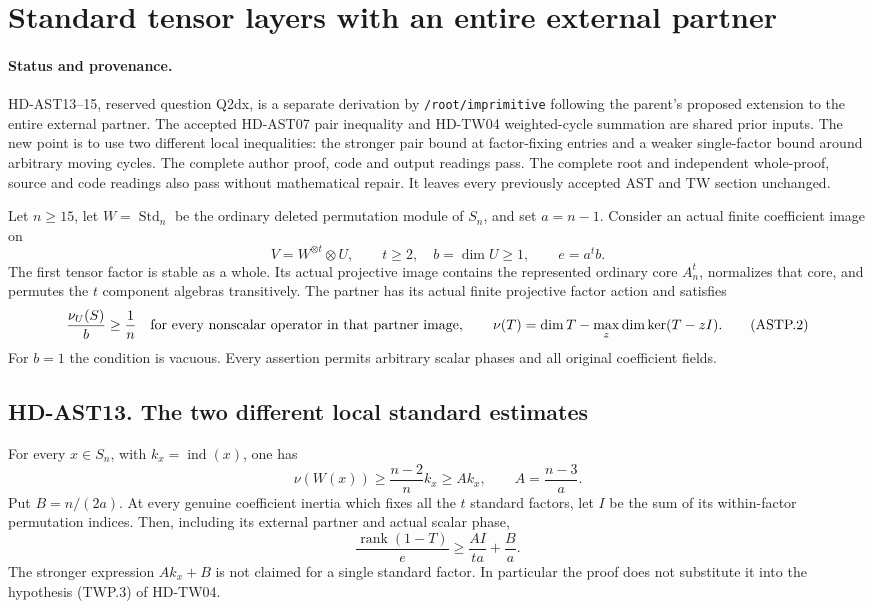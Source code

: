 \section{Standard tensor layers with an entire external partner}
\label{sec:standard-entire-partner}

\paragraph{Status and provenance.}
HD-AST13--15, reserved question Q2dx, is a separate derivation by
\texttt{/root/imprimitive} following the parent's proposed extension
to the entire external partner.  The accepted HD-AST07 pair inequality
and HD-TW04 weighted-cycle summation are shared prior inputs.  The new
point is to use two different local inequalities: the stronger pair
bound at factor-fixing entries and a weaker single-factor bound around
arbitrary moving cycles.  The complete author proof, code and output
readings pass. The complete root and independent whole-proof, source and code readings also pass without mathematical repair.  It leaves every
previously accepted AST and TW section unchanged.

Let $n\ge15$, let $W=\operatorname{Std}_n$ be the ordinary deleted
permutation module of $S_n$, and set $a=n-1$.  Consider an actual
finite coefficient image on
\[
 V=W^{\otimes t}\otimes U,\qquad t\ge2,\quad b=\dim U\ge1,
 \qquad e=a^t b.
 \tag{ASTP.1}
\]
The first tensor factor is stable as a whole.  Its actual projective
image contains the represented ordinary core $A_n^t$, normalizes that
core, and permutes the $t$ component algebras transitively.  The partner
has its actual finite projective factor action and satisfies
\[
 \frac{\nu_U(S)}b\ge\frac1n
 \quad\hbox{for every nonscalar operator in that partner image},
 \qquad
 \nu(T)=\dim T-\max_z\dim\ker(T-zI).
 \tag{ASTP.2}
\]
For $b=1$ the condition is vacuous.  Every assertion permits arbitrary
scalar phases and all original coefficient fields.

\subsection*{HD-AST13. The two different local standard estimates}

\begin{lemma}[HD-AST13]
For every $x\in S_n$, with $k_x=\operatorname{ind}(x)$, one has
\[
 \nu(W(x))\ge\frac{n-2}{n}k_x
             \ge A k_x,
 \qquad A=\frac{n-3}{a}.
 \tag{ASTP.3}
\]
Put $B=n/(2a)$.  At every genuine coefficient inertia which fixes
all the $t$ standard factors, let $I$ be the sum of its within-factor
permutation indices.  Then, including its external partner and actual
scalar phase,
\[
                 \frac{\operatorname{rank}(1-T)}e
                   \ge\frac{A I}{ta}+\frac Ba.
 \tag{ASTP.4}
\]
The stronger expression $A k_x+B$ is not claimed for a single
standard factor.  In particular the proof does not substitute it
into the hypothesis (TWP.3) of HD-TW04.
\end{lemma}

